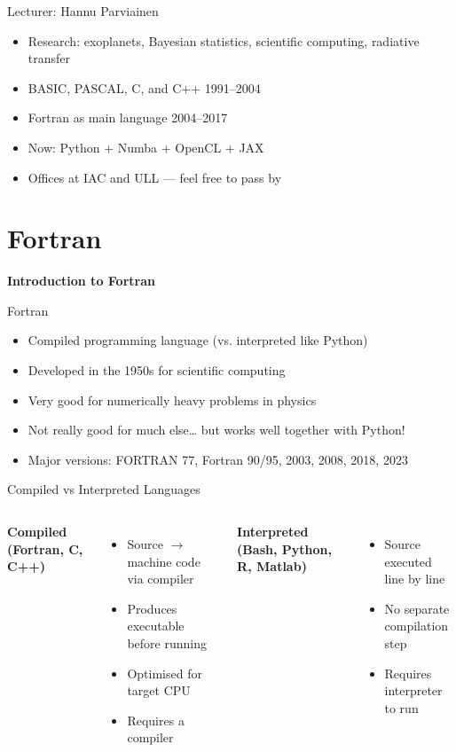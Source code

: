 \begin{frame}{Lecturer: Hannu Parviainen}
  \begin{itemize}
    \item Research: exoplanets, Bayesian statistics, scientific computing, radiative transfer
    \item BASIC, PASCAL, C, and C++ 1991--2004
    \item Fortran as main language 2004--2017
    \item Now: Python + Numba + OpenCL + JAX
    \item Offices at IAC and ULL — feel free to pass by
  \end{itemize}
\end{frame}



\section{Fortran}

\begin{frame}
	\centering
	\Huge \textbf{Introduction to Fortran}
\end{frame}

\begin{frame}{Fortran}
	\begin{itemize}
		\item Compiled programming language (vs. interpreted like Python)
		\item Developed in the 1950s for scientific computing
		\item Very good for numerically heavy problems in physics
		\item Not really good for much else… but works well together with Python!
		\item Major versions: FORTRAN 77, Fortran 90/95, 2003, 2008, 2018, 2023
	\end{itemize}
\end{frame}


\begin{frame}{Compiled vs Interpreted Languages}
	\begin{columns}[T]
		\textbf{Compiled (Fortran, C, C++)}
		\begin{itemize}
			\item Source $\to$ machine code via compiler
			\item Produces executable before running
			\item Optimised for target CPU
			\item Requires a compiler
		\end{itemize}
		
		\textbf{Interpreted (Bash, Python, R, Matlab)}
		\begin{itemize}
			\item Source executed line by line
			\item No separate compilation step
			\item Requires interpreter to run
		\end{itemize}
	\end{columns}
\end{frame}

